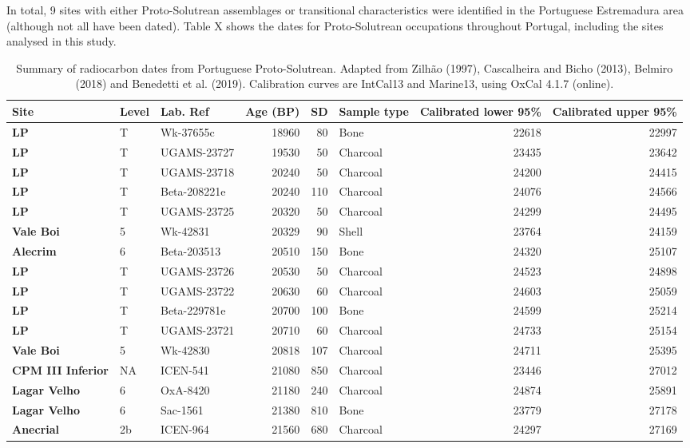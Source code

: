\documentclass[12pt,twoside]{reedthesis}
\begin{document}
In total, 9 sites with either Proto-Solutrean assemblages or transitional characteristics were identified in the Portuguese Estremadura area (although not all have been dated). Table X shows the dates for Proto-Solutrean occupations throughout Portugal, including the sites analysed in this study.
\begin{table}

\caption{\label{tab:unnamed-chunk-2}Summary of radiocarbon dates from Portuguese Proto-Solutrean. Adapted from Zilhão (1997), Cascalheira and Bicho (2013), Belmiro (2018) and Benedetti et al. (2019). Calibration curves are IntCal13 and Marine13, using OxCal 4.1.7 (online).}
\centering
\begin{tabular}[t]{>{\bfseries}lllrrlrr}
\toprule
Site & Level & Lab. Ref & Age (BP) & SD & Sample type & Calibrated lower 95\% & Calibrated upper 95\%\\
\midrule
LP & T & Wk-37655c & 18960 & 80 & Bone & 22618 & 22997\\
LP & T & UGAMS-23727 & 19530 & 50 & Charcoal & 23435 & 23642\\
LP & T & UGAMS-23718 & 20240 & 50 & Charcoal & 24200 & 24415\\
LP & T & Beta-208221e & 20240 & 110 & Charcoal & 24076 & 24566\\
LP & T & UGAMS-23725 & 20320 & 50 & Charcoal & 24299 & 24495\\
\addlinespace
Vale Boi & 5 & Wk-42831 & 20329 & 90 & Shell & 23764 & 24159\\
Alecrim & 6 & Beta-203513 & 20510 & 150 & Bone & 24320 & 25107\\
LP & T & UGAMS-23726 & 20530 & 50 & Charcoal & 24523 & 24898\\
LP & T & UGAMS-23722 & 20630 & 60 & Charcoal & 24603 & 25059\\
LP & T & Beta-229781e & 20700 & 100 & Bone & 24599 & 25214\\
\addlinespace
LP & T & UGAMS-23721 & 20710 & 60 & Charcoal & 24733 & 25154\\
Vale Boi & 5 & Wk-42830 & 20818 & 107 & Charcoal & 24711 & 25395\\
CPM III Inferior & NA & ICEN-541 & 21080 & 850 & Charcoal & 23446 & 27012\\
Lagar Velho & 6 & OxA-8420 & 21180 & 240 & Charcoal & 24874 & 25891\\
Lagar Velho & 6 & Sac-1561 & 21380 & 810 & Bone & 23779 & 27178\\
\addlinespace
Anecrial & 2b & ICEN-964 & 21560 & 680 & Charcoal & 24297 & 27169\\

\end{tabular}
\end{table}
\end{document}
